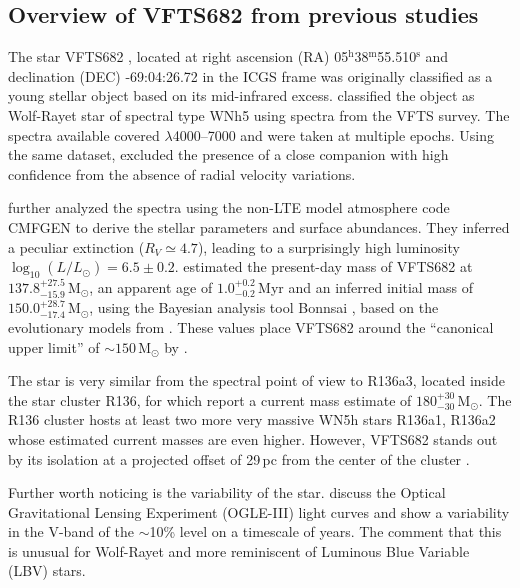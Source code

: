 \documentclass[apjl,twocolumn]{emulateapj}
\newcommand{\todo}[1]{{\large $\blacksquare$~\textbf{\color{red}[#1]}}~$\blacksquare$}
\newcommand{\Msun}{{\,\mathrm{M}_\odot}}
\DeclareRobustCommand{\Secref}[1]{Sec.~\ref{#1}}
\begin{document}

\subsection{ Overview of VFTS682 from previous studies \label{data:vfts683}}

The star VFTS682  \citep{evans:11}, located at right ascension (RA)
05$^\mathrm{h}$38$^\mathrm{m}$55.510$^\mathrm{s}$  and declination
(DEC) -69:04:26.72 in the ICGS frame \citep[][]{brown:18}
was originally classified as a young stellar object \citep{gruendl:09}
based on its mid-infrared excess.  \citet{evans:11} classified the
object as Wolf-Rayet star of spectral type WNh5 using spectra from the
VFTS survey.  The spectra available covered $\lambda$4000--7000 and
were taken at multiple epochs. Using the same dataset,
\citet{bestenlehner:11} excluded the presence of a close companion
with high confidence from the absence of radial velocity variations.

\citet{bestenlehner:11} further analyzed the spectra using the non-LTE
model atmosphere code CMFGEN \citep{hillier:98} to derive the stellar
parameters and surface abundances. They inferred a peculiar extinction
($R_V\simeq4.7$), leading to a surprisingly high luminosity
$\log_{10}(L/L_\odot) =  6.5\pm0.2$. \citep{schneider:18} estimated
the present-day mass of VFTS682 at  $137.8^{+27.5}_ {-15.9}\Msun$, an
apparent age of $1.0^{+0.2}_{-0.2}$\,Myr and an inferred initial mass
of $150.0^{+28.7}_{-17.4}\Msun$, using the Bayesian analysis tool Bonnsai
\citep{schneider:17}, based on the evolutionary models from
\citet{brott:11, kohler:15}. These values place VFTS682 around the
``canonical upper limit'' of $\sim$$150\Msun$ by \citet{figer:05}.

The star is very similar from the spectral point of view to R136a3, located inside the star cluster
R136, \citep{crowther:10}  for which \citet{crowther:16} report a
current mass estimate of $180^{+30}_{-30}\Msun$. The R136 cluster hosts
at least two more very massive WN5h stars R136a1, R136a2 whose
estimated current masses are even higher. However, VFTS682 stands
out by its isolation at a projected offset of 29\,pc from the center
of the cluster \citep{bestenlehner:11}.  

Further worth noticing is the variability of the star.
\citep{bestenlehner:11} discuss the Optical Gravitational Lensing
Experiment (OGLE-III) light curves \citep{udalski:08} and show a
variability in the V-band of the $\sim$10\% level on a timescale of years.
The comment that this is unusual for Wolf-Rayet and more reminiscent
of Luminous Blue Variable (LBV) stars. 
\end{document}
